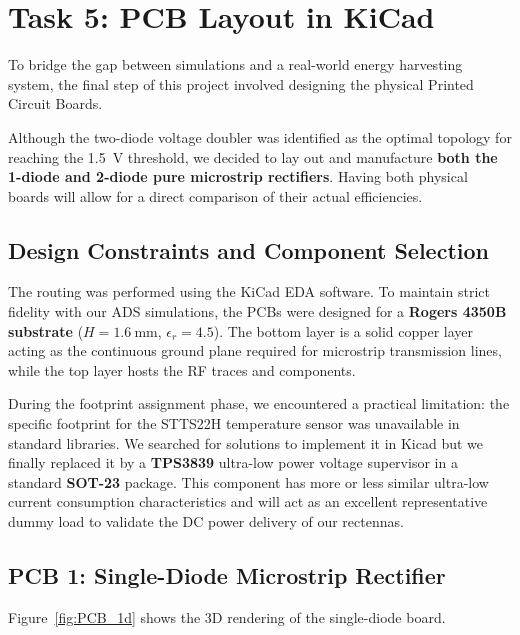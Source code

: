 
\section{Task 5: PCB Layout in KiCad}
\label{sec:kicad_layout}

To bridge the gap between simulations and a real-world energy harvesting system, the final step of this project involved designing the physical Printed Circuit Boards. 

Although the two-diode voltage doubler was identified as the optimal topology for reaching the \SI{1.5}{\volt} threshold, we decided to lay out and manufacture \textbf{both the 1-diode and 2-diode pure microstrip rectifiers}. Having both physical boards will allow for a direct comparison of their actual efficiencies.

\subsection{Design Constraints and Component Selection}

The routing was performed using the KiCad EDA software. To maintain strict fidelity with our ADS simulations, the PCBs were designed for a \textbf{Rogers 4350B substrate} ($H = \SI{1.6}{\milli\meter}$, $\epsilon_r = 4.5$). The bottom layer is a solid copper layer acting as the continuous ground plane required for microstrip transmission lines, while the top layer hosts the RF traces and components.

During the footprint assignment phase, we encountered a practical limitation: the specific footprint for the STTS22H temperature sensor was unavailable in standard libraries. We searched for solutions to implement it in Kicad but we finally replaced it by a \textbf{TPS3839} ultra-low power voltage supervisor in a standard \textbf{SOT-23} package. This component has more or less similar ultra-low current consumption characteristics and will act as an excellent representative dummy load to validate the DC power delivery of our rectennas.

\subsection{PCB 1: Single-Diode Microstrip Rectifier}

Figure~\ref{fig:PCB_1d} shows the 3D rendering of the single-diode board.


